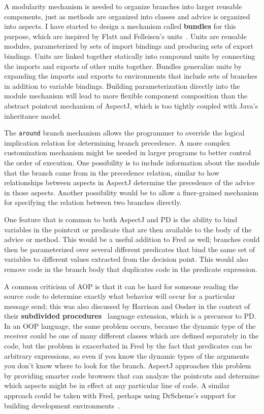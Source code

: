 \documentclass{acm_proc_article-sp}
\newcommand{\defn}[1]{\textbf{#1}}
\newcommand{\code}[1]{\texttt{#1}}
\begin{document}
A modularity mechanism is needed to organize branches into larger
reusable components, just as methods are organized into classes and
advice is organized into aspects.  I have started to design a
mechanism called \defn{bundles} for this purpose, which are inspired
by Flatt and Felleisen's units~\cite{flatt98units}.  Units are
reusable modules, parameterized by sets of import bindings and
producing sets of export bindings.  Units are linked together
statically into compound units by connecting the imports and exports
of other units together.  Bundles generalize units by expanding the
imports and exports to environments that include sets of branches in
addition to variable bindings.  Building parameterization directly
into the module mechanism will lead to more flexible component
composition than the abstract pointcut mechanism of AspectJ, which is
too tightly coupled with Java's inheritance model.

The \code{around} branch mechanism allows the programmer to override
the logical implication relation for determining branch precedence.
A more complex customization mechanism might be needed in larger
programs to better control the order of execution.  One possibility is
to include information about the module that the branch came from in
the precedence relation, similar to how relationships between aspects
in AspectJ determine the precedence of the advice in those aspects.
Another possibility would be to allow a finer-grained mechanism for
specifying the relation between two branches directly.

One feature that is common to both AspectJ and PD is the ability to
bind variables in the pointcut or predicate that are then available to
the body of the advice or method.  This would be a useful addition to
Fred as well; branches could then be parameterized over several
different predicates that bind the same set of variables to different
values extracted from the decision point.  This would also remove code
in the branch body that duplicates code in the predicate expression.

A common criticism of AOP is that it can be hard for someone reading
the source code to determine exactly what behavior will occur for a
particular message send; this was also discussed by Harrison and
Ossher in the context of their \defn{subdivided
procedures}~\cite{subdiv-proc} language extension, which is a
precursor to PD.  In an OOP language, the same problem occurs, because
the dynamic type of the receiver could be one of many different
classes which are defined separately in the code, but the problem is
exacerbated in Fred by the fact that predicates can be arbitrary
expressions, so even if you know the dynamic types of the arguments
you don't know where to look for the branch.  AspectJ approaches this
problem by providing smarter code browsers that can analyze the
pointcuts and determine which aspects might be in effect at any
particular line of code.  A similar approach could be taken with Fred,
perhaps using DrScheme's support for building development
environments~\cite{DrScheme}.
\end{document}
